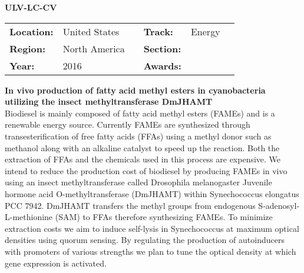 \textbf{\uppercase{ULV-LC-CV}} \FloatBarrier \begin{table}[h] \begin{tabular}{lp{2.5cm}llll} \textbf{Location:} & United States & \multicolumn{1}{|l}{} & \textbf{Track:}   & Energy \\ \textbf{Region:}   & North America   & \multicolumn{1}{|l}{} & \textbf{Section:} &  \\ \textbf{Year:}     & 2016   & \multicolumn{1}{|l}{} & \textbf{Awards:}  & \end{tabular} \end{table} \FloatBarrier \noindent\textbf{In vivo production of fatty acid methyl esters in cyanobacteria utilizing the insect methyltransferase DmJHAMT } \vspace{.2cm}\\ 
Biodiesel is mainly composed of fatty acid methyl esters (FAMEs) and is a renewable energy source. Currently FAMEs are synthesized through transesterification of free fatty acids (FFAs) using a methyl donor such as methanol along with an alkaline catalyst to speed up the reaction. Both the extraction of FFAs and the chemicals used in this process are expensive. We intend to reduce the production cost of biodiesel by producing FAMEs in vivo using an insect methyltransferase called Drosophila melanogaster Juvenile hormone acid O-methyltransferase (DmJHAMT) within Synechococcus elongatus PCC 7942. DmJHAMT transfers the methyl groups from endogenous S-adenosyl-L-methionine (SAM) to FFAs therefore synthesizing FAMEs.  To minimize extraction costs we aim to induce self-lysis in Synechococcus at maximum optical densities using quorum sensing.  By regulating the production of autoinducers with promoters of various strengths we plan to tune the optical density at which gene expression is activated.
\vspace{2cm} $ $
\pagebreak

